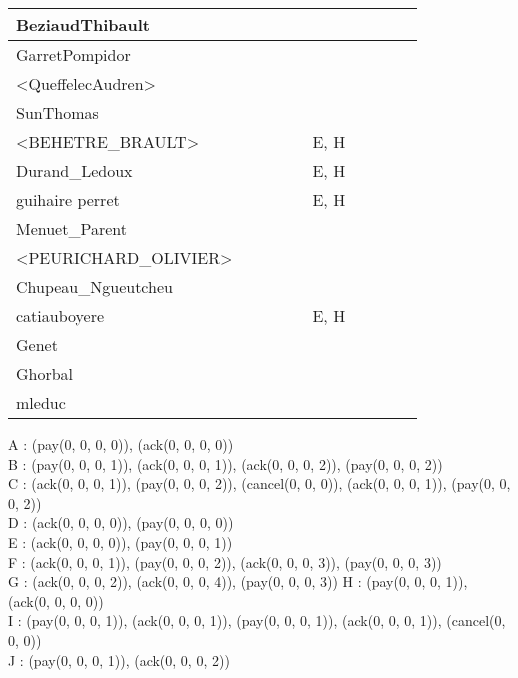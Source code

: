 \documentclass[a4paper]{article}
\begin{document}
\begin{table}[h!]
\begin{tabular}{|l|c|c|c|c|c|c|c|c|c|}
    BeziaudThibault         &       &       &       &       &       &       &       &       &       \\ \hline
    GarretPompidor          &       &       &       &       &       &       &       &       &       \\ \hline
    <QueffelecAudren>       &       &       &       &       &       &       &       &       &       \\ \hline
    SunThomas               &       &       &       &       &       &       &       &       &       \\ \hline
    <BEHETRE\_BRAULT>       &       &       &       &       & E, H  &       &       &       &       \\ \hline
    Durand\_Ledoux          &       &       &       &       & E, H  &       &       &       &       \\ \hline
    guihaire perret         &       &       &       &       & E, H  &       &       &       &       \\ \hline
    Menuet\_Parent          &       &       &       &       &       &       &       &       &       \\ \hline
    <PEURICHARD\_OLIVIER>   &       &       &       &       &       &       &       &       &       \\ \hline
    Chupeau\_Ngueutcheu     &       &       &       &       &       &       &       &       &       \\ \hline
    catiauboyere            &       &       &       &       & E, H  &       &       &       &       \\ \hline
    Genet                   &       &       &       &       &       &       &       &       &       \\ \hline
    Ghorbal                 &       &       &       &       &       &       &       &       &       \\ \hline
    mleduc                  &       &       &       &       &       &       &       &       &       \\ \hline
\end{tabular}
\end{table}


\newpage
\noindent
A :  (pay(0, 0, 0, 0)), (ack(0, 0, 0, 0)) \\
B :  (pay(0, 0, 0, 1)), (ack(0, 0, 0, 1)), (ack(0, 0, 0, 2)), (pay(0, 0, 0, 2))\\
C :  (ack(0, 0, 0, 1)), (pay(0, 0, 0, 2)), (cancel(0, 0, 0)), (ack(0, 0, 0, 1)), (pay(0, 0, 0, 2))\\
D :  (ack(0, 0, 0, 0)), (pay(0, 0, 0, 0))\\
E :  (ack(0, 0, 0, 0)), (pay(0, 0, 0, 1))\\
F :  (ack(0, 0, 0, 1)), (pay(0, 0, 0, 2)), (ack(0, 0, 0, 3)), (pay(0, 0, 0, 3))\\
G :  (ack(0, 0, 0, 2)), (ack(0, 0, 0, 4)), (pay(0, 0, 0, 3))
H :  (pay(0, 0, 0, 1)), (ack(0, 0, 0, 0))\\
I :  (pay(0, 0, 0, 1)), (ack(0, 0, 0, 1)), (pay(0, 0, 0, 1)), (ack(0, 0, 0, 1)), (cancel(0, 0, 0))\\
J :  (pay(0, 0, 0, 1)), (ack(0, 0, 0, 2))\\
\end{document}
